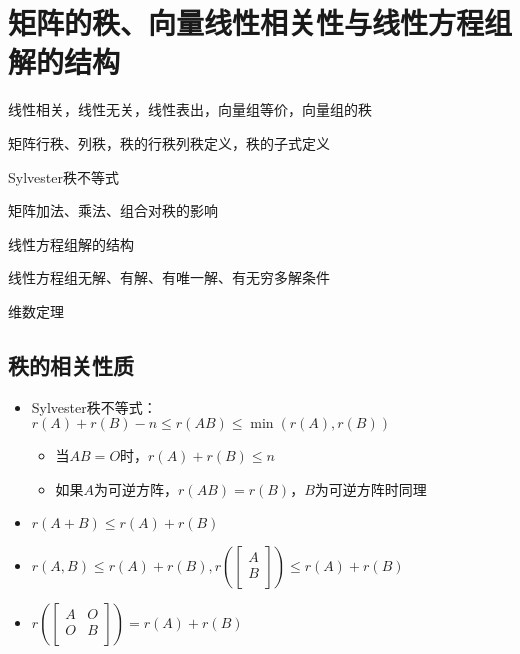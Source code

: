 \documentclass[lang=cn,newtx,10pt,scheme=chinese]{elegantbook}
\begin{document}
\chapter{矩阵的秩、向量线性相关性与线性方程组解的结构}

\begin{introduction}[需要熟悉的知识点]
    \item 线性相关，线性无关，线性表出，向量组等价，向量组的秩
	\item 矩阵行秩、列秩，秩的行秩列秩定义，秩的子式定义
	\item Sylvester秩不等式
	\item 矩阵加法、乘法、组合对秩的影响
	\item 线性方程组解的结构
	\item 线性方程组无解、有解、有唯一解、有无穷多解条件
	\item 维数定理
\end{introduction}

\section{秩的相关性质}

\begin{itemize}
    \item Sylvester秩不等式：$r(A) + r(B) - n \le r(AB) \le \min(r(A),r(B))$
    \begin{itemize}
        \item 当$AB = O$时，$r(A) + r(B) \le n$
        \item 如果$A$为可逆方阵，$r(AB) = r(B)$，$B$为可逆方阵时同理
    \end{itemize}
    \item $r(A + B) \le r(A) + r(B)$
    \item $r(A,B) \le r(A) + r(B), 
        r\left(\left[
            \begin{matrix}
                A \\
                B \\
            \end{matrix}
            \right]\right) \le r(A) + r(B)$
    \item $r\left(\left[
        \begin{matrix}
            A & O \\
            O & B \\
        \end{matrix}
        \right]\right) = r(A) + r(B)$
\end{itemize}
\end{document}
